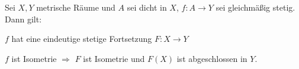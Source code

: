 \documentclass{article}
\begin{document}
\begin{satz}
Sei $X,Y $ metrische Räume und $A$ sei dicht in $X$, $f: A \to Y$ sei gleichmäßig stetig. Dann gilt: 
\begin{liste}
\item $f$ hat eine eindeutige stetige Fortsetzung $F: X \to Y$
\item $f$ ist Isometrie $\Rightarrow$ $F$ ist Isometrie und $F(X)$ ist abgeschlossen in $Y$.
\end{liste} 
\end{satz}
\end{document}
